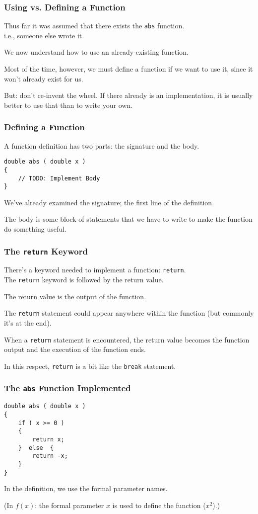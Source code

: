 \begin{frame}
\frametitle{Using vs. Defining a Function}
Thus far it was assumed that there exists the \texttt{abs} function.\\
\quad i.e., someone else wrote it.

We now understand how to use an already-existing function.

Most of the time, however, we must define a function if we want to use it, since it won't already exist for us.

But: don't re-invent the wheel. If there already is an implementation, it is usually better to use that than to write your own.

\end{frame}

\begin{frame}[fragile]
\frametitle{Defining a Function}


A function definition has two parts: the signature and the body.

\begin{verbatim}
double abs ( double x ) 
{
    // TODO: Implement Body
}
\end{verbatim}

We've already examined the signature; the first line of the definition.

The body is some block of statements that we have to write to make the function do something useful.

\end{frame}

\begin{frame}
\frametitle{The \texttt{return} Keyword}

There's a keyword needed to implement a function: \texttt{return}.\\
\quad The \texttt{return} keyword is followed by the \alert{return value}.

The return value is the output of the function.

The \texttt{return} statement could appear anywhere within the function (but commonly it's at the end).

When a \texttt{return} statement is encountered, the return value becomes the function output and the execution of the function ends.

In this respect, \texttt{return} is a bit like the \texttt{break} statement.

\end{frame}

\begin{frame}[fragile]
\frametitle{The \texttt{abs} Function Implemented}

\begin{verbatim}
double abs ( double x ) 
{
    if ( x >= 0 ) 
    {
        return x;
    }  else  {
        return -x;
    }
}
\end{verbatim}

In the definition, we use the formal parameter names. 

(In $f(x)$: the formal parameter $x$ is used to define the function ($x^{2}$).)

\end{frame}

